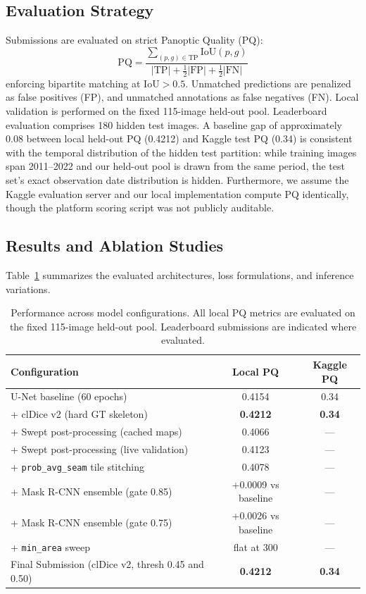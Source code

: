 \documentclass[sigconf]{acmart}
\begin{document}
\subsection{Evaluation Strategy}
Submissions are evaluated on strict Panoptic Quality (PQ):
\begin{equation}
\text{PQ} = \frac{\sum_{(p, g) \in \text{TP}} \text{IoU}(p, g)}{|\text{TP}| + \frac{1}{2}|\text{FP}| + \frac{1}{2}|\text{FN}|}
\end{equation}
enforcing bipartite matching at $\text{IoU}>0.5$. Unmatched predictions are penalized as false positives (FP), and unmatched annotations as false negatives (FN). Local validation is performed on the fixed 115-image held-out pool. Leaderboard evaluation comprises 180 hidden test images. A baseline gap of approximately 0.08 between local held-out PQ (0.4212) and Kaggle test PQ (0.34) is consistent with the temporal distribution of the hidden test partition: while training images span 2011--2022 and our held-out pool is drawn from the same period, the test set's exact observation date distribution is hidden. Furthermore, we assume the Kaggle evaluation server and our local implementation compute PQ identically, though the platform scoring script was not publicly auditable.

\subsection{Results and Ablation Studies}
Table~\ref{tab:ablation} summarizes the evaluated architectures, loss formulations, and inference variations.

\begin{table}[h]
\centering
\small
\caption{Performance across model configurations. All local PQ metrics are evaluated on the fixed 115-image held-out pool. Leaderboard submissions are indicated where evaluated.}
\label{tab:ablation}
\begin{tabular}{lcc}
\toprule
\textbf{Configuration} & \textbf{Local PQ} & \textbf{Kaggle PQ} \\
\midrule
U-Net baseline (60 epochs) & 0.4154 & 0.34 \\
+ clDice v2 (hard GT skeleton) & \textbf{0.4212} & \textbf{0.34} \\
+ Swept post-processing (cached maps) & 0.4066 & --- \\
+ Swept post-processing (live validation) & 0.4123 & --- \\
+ \texttt{prob\_avg\_seam} tile stitching & 0.4078 & --- \\
+ Mask R-CNN ensemble (gate 0.85) & +0.0009 vs baseline & --- \\
+ Mask R-CNN ensemble (gate 0.75) & +0.0026 vs baseline & --- \\
+ \texttt{min\_area} sweep & flat at 300 & --- \\
\midrule
Final Submission (clDice v2, thresh 0.45 and 0.50) & \textbf{0.4212} & \textbf{0.34} \\
\bottomrule
\end{tabular}
\end{table}
\end{document}
